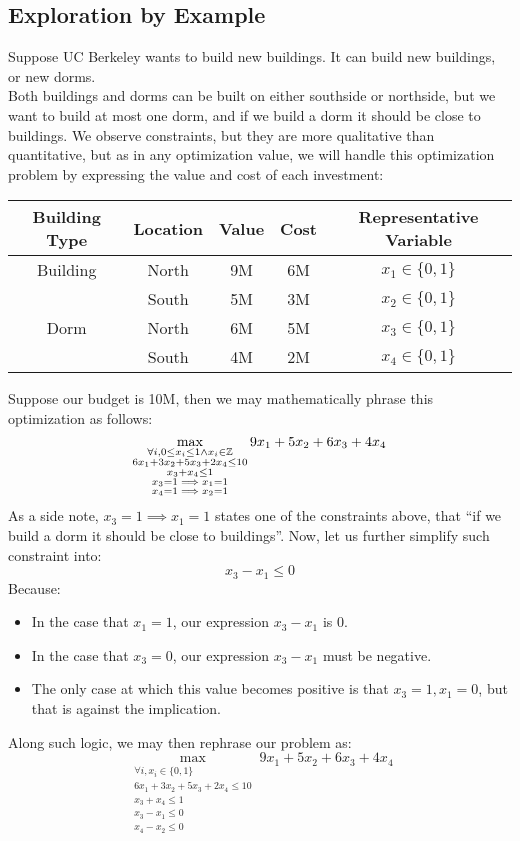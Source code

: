\subsection{Exploration by Example}
Suppose UC Berkeley wants to build new buildings. It can build new buildings, or new dorms. \\
Both buildings and dorms can be built on either southside or northside, but we want to build at most one dorm, and if we build a dorm it should be close to buildings.
We observe constraints, but they are more qualitative than quantitative, but as in any optimization value, we will handle this optimization problem by expressing the value and cost of each investment:
\begin{center}
    \begin{tabular}{c|c||c|c||c}
        Building Type & Location & Value & Cost & Representative Variable \\
        \hline
        \hline
        Building & North & 9M & 6M & $x_1 \in \{0, 1\}$ \\
        & South & 5M & 3M & $x_2 \in \{0, 1\}$ \\
        \hline
        Dorm & North & 6M & 5M & $x_3 \in \{0, 1\}$ \\
        & South & 4M & 2M & $x_4 \in \{0, 1\}$
    \end{tabular}
\end{center}
Suppose our budget is 10M, then we may mathematically phrase this optimization as follows:
\[
    \max_{
        \substack{ 
            \forall i, 0 \leq x_i \leq 1 \land x_i \in \mathbb{Z} \\
            6x_1 + 3x_2 + 5x_3 + 2x_4 \leq 10 \\
            x_3 + x_4 \leq 1 \\
            x_3 = 1 \implies x_1 = 1 \\
            x_4 = 1 \implies x_2 = 1
        }
    } 9x_1 + 5x_2 + 6x_3 + 4x_4
\]
As a side note, $x_3 = 1 \implies x_1 = 1$ states one of the constraints above, that ``if we build a dorm it should be close to buildings''.
Now, let us further simplify such constraint into:
\[
    x_3 - x_1 \leq 0
\]
Because:
\begin{itemize}
    \item In the case that $x_1 = 1$, our expression $x_3 - x_1$ is $0$.
    \item In the case that $x_3 = 0$, our expression $x_3 - x_1$ must be negative.
    \item The only case at which this value becomes positive is that $x_3 = 1, x_1 = 0$, but that is against the implication.
\end{itemize}
Along such logic, we may then rephrase our problem as:
\[
    \max_{
        \substack{ 
            \forall i, x_i \in \{0, 1\} \\
            6x_1 + 3x_2 + 5x_3 + 2x_4 \leq 10 \\
            x_3 + x_4 \leq 1 \\
            x_3 - x_1 \leq 0 \\
            x_4 - x_2 \leq 0
        }
    } 9x_1 + 5x_2 + 6x_3 + 4x_4
\]

